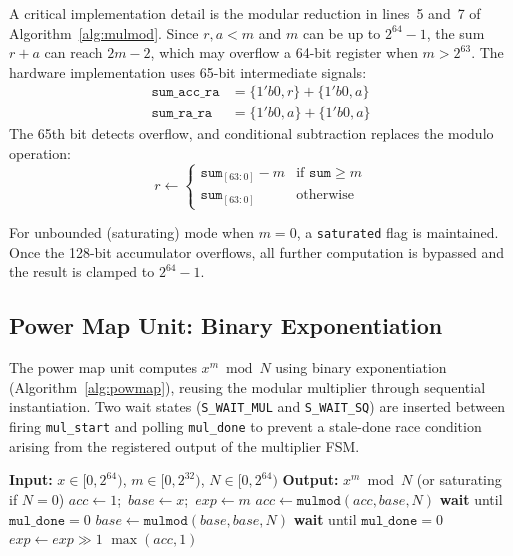 \documentclass[lettersize,journal]{IEEEtran}
\begin{document}
A critical implementation detail is the modular reduction in lines~5 and~7 of Algorithm~\ref{alg:mulmod}. Since $r, a < m$ and $m$ can be up to $2^{64} - 1$, the sum $r + a$ can reach $2m - 2$, which may overflow a 64-bit register when $m > 2^{63}$. The hardware implementation uses 65-bit intermediate signals:
\begin{align}
\texttt{sum\_acc\_ra} &= \{1'b0, r\} + \{1'b0, a\} \label{eq:sum65a} \\
\texttt{sum\_ra\_ra}  &= \{1'b0, a\} + \{1'b0, a\} \label{eq:sum65b}
\end{align}
The 65th bit detects overflow, and conditional subtraction replaces the modulo operation:
\begin{equation}
r \gets \begin{cases}
\texttt{sum}_{[63:0]} - m & \text{if } \texttt{sum} \geq m \\
\texttt{sum}_{[63:0]} & \text{otherwise}
\end{cases}
\label{eq:condmod}
\end{equation}

For unbounded (saturating) mode when $m = 0$, a \texttt{saturated} flag is maintained. Once the 128-bit accumulator overflows, all further computation is bypassed and the result is clamped to $2^{64} - 1$.

\subsection{Power Map Unit: Binary Exponentiation}

The power map unit computes $x^m \bmod N$ using binary exponentiation (Algorithm~\ref{alg:powmap}), reusing the modular multiplier through sequential instantiation. Two wait states (\texttt{S\_WAIT\_MUL} and \texttt{S\_WAIT\_SQ}) are inserted between firing \texttt{mul\_start} and polling \texttt{mul\_done} to prevent a stale-done race condition arising from the registered output of the multiplier FSM.

\begin{algorithm}[!t]
\caption{Binary Exponentiation Power Map}\label{alg:powmap}
\begin{algorithmic}
\STATE \textbf{Input:} $x \in [0, 2^{64})$, $m \in [0, 2^{32})$, $N \in [0, 2^{64})$
\STATE \textbf{Output:} $x^m \bmod N$ (or saturating if $N = 0$)
\STATE $\textit{acc} \gets 1$;~$\textit{base} \gets x$;~$\textit{exp} \gets m$
        \STATE $\textit{acc} \gets \texttt{mulmod}(\textit{acc}, \textit{base}, N)$
        \STATE \textbf{wait} until $\texttt{mul\_done} = 0$ 
    \ENDIF
    \STATE $\textit{base} \gets \texttt{mulmod}(\textit{base}, \textit{base}, N)$
    \STATE \textbf{wait} until $\texttt{mul\_done} = 0$ 
    \STATE $\textit{exp} \gets \textit{exp} \gg 1$
\ENDWHILE
\RETURN $\max(\textit{acc}, 1)$ 
\end{algorithmic}
\end{algorithm}
\end{document}

